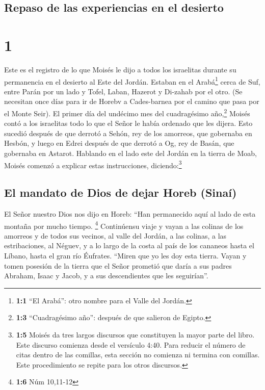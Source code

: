 \hypertarget{repaso-de-las-experiencias-en-el-desierto}{%
\subsection{Repaso de las experiencias en el
desierto}\label{repaso-de-las-experiencias-en-el-desierto}}

\hypertarget{section}{%
\section{1}\label{section}}

 Este es el registro de lo que Moisés le dijo a todos los
israelitas durante su permanencia en el desierto al Este del Jordán.
Estaban en el Arabá\footnote{\textbf{1:1} ``El Arabá'': otro nombre para
  el Valle del Jordán.} cerca de Suf, entre Parán por un lado y Tofel,
Laban, Hazerot y Di-zahab por el otro.  (Se necesitan once
días para ir de Horebv a Cades-barnea por el camino que pasa por el
Monte Seir).  El primer día del undécimo mes del
cuadragésimo año,\footnote{\textbf{1:3} ``Cuadragésimo año'': después de
  que salieron de Egipto.} Moisés contó a los israelitas todo lo que el
Señor le había ordenado que les dijera.  Esto sucedió
después de que derrotó a Sehón, rey de los amorreos, que gobernaba en
Hesbón, y luego en Edrei después de que derrotó a Og, rey de Basán, que
gobernaba en Astarot.  Hablando en el lado este del Jordán
en la tierra de Moab, Moisés comenzó a explicar estas instrucciones,
diciendo:\footnote{\textbf{1:5} Moisés da tres largos discursos que
  constituyen la mayor parte del libro. Este discurso comienza desde el
  versículo 4:40. Para reducir el número de citas dentro de las
  comillas, esta sección no comienza ni termina con comillas. Este
  procedimiento se repite para los otros discursos.}

\hypertarget{el-mandato-de-dios-de-dejar-horeb-sinauxed}{%
\subsection{El mandato de Dios de dejar Horeb
(Sinaí)}\label{el-mandato-de-dios-de-dejar-horeb-sinauxed}}

 El Señor nuestro Dios nos dijo en Horeb: ``Han
permanecido aquí al lado de esta montaña por mucho tiempo. \footnote{\textbf{1:6}
  Núm 10,11-12}  Continúensu viaje y vayan a las colinas
de los amorreos y de todos sus vecinos, al valle del Jordán, a las
colinas, a las estribaciones, al Néguev, y a lo largo de la costa al
país de los cananeos hasta el Líbano, hasta el gran río Éufrates.
 ``Miren que yo les doy esta tierra. Vayan y tomen
posesión de la tierra que el Señor prometió que daría a sus padres
Abraham, Isaac y Jacob, y a sus descendientes que les seguirían''.

